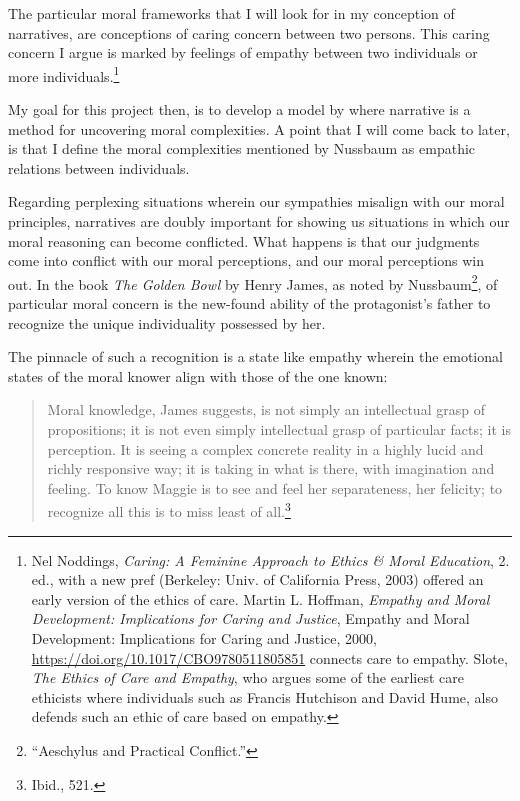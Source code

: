 \documentclass[phdthesis,12pt,final,a4paper]{wuthesis}
\theoremstyle{definition}
\theoremstyle{definition}
\theoremstyle{definition}
\theoremstyle{definition}
\theoremstyle{remark}
\begin{document}
The particular moral frameworks that I will look for in my conception of narratives, are conceptions of caring concern between two persons. This caring concern I argue is marked by feelings of empathy between two individuals or more individuals.\footnote{Nel Noddings, \emph{Caring: A Feminine Approach to Ethics \& Moral Education}, 2. ed., with a new pref (Berkeley: Univ. of California Press, 2003) offered an early version of the ethics of care. Martin L. Hoffman, \emph{Empathy and Moral Development: {Implications} for Caring and Justice}, Empathy and Moral Development: {Implications} for Caring and Justice, 2000, \url{https://doi.org/10.1017/CBO9780511805851} connects care to empathy. Slote, \emph{The {Ethics} of {Care} and {Empathy}}, who argues some of the earliest care ethicists where individuals such as Francis Hutchison and David Hume, also defends such an ethic of care based on empathy.}

My goal for this project then, is to develop a model by where narrative is a method for uncovering moral complexities. A point that I will come back to later, is that I define the moral complexities mentioned by Nussbaum as empathic relations between individuals.

Regarding perplexing situations wherein our sympathies misalign with our moral principles, narratives are doubly important for showing us situations in which our moral reasoning can become conflicted. What happens is that our judgments come into conflict with our moral perceptions, and our moral perceptions win out. In the book \emph{The Golden Bowl} by Henry James, as noted by Nussbaum\footnote{{``Aeschylus and Practical Conflict.''}}, of particular moral concern is the new-found ability of the protagonist's father to recognize the unique individuality possessed by her.

The pinnacle of such a recognition is a state like empathy wherein the emotional states of the moral knower align with those of the one known:

\begin{quote}
Moral knowledge, James suggests, is not simply an intellectual grasp of propositions; it is not even simply intellectual grasp of particular facts; it is perception. It is seeing a complex concrete reality in a highly lucid and richly responsive way; it is taking in what is there, with imagination and feeling. To know Maggie is to see and feel her separateness, her felicity; to recognize all this is to miss least of all.\footnote{Ibid., 521.}
\end{quote}
\end{document}
